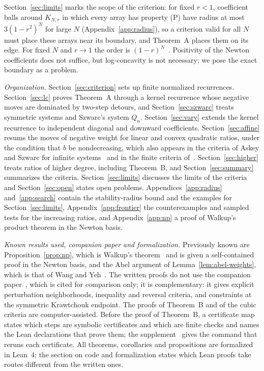 Section~\ref{sec:limits} marks the scope of the criterion: for fixed $r<1$, coefficient balls around $K_{N,r}$ in which every array has property (P) have radius at most $3(1-r^2)^N$ for large $N$ (Appendix~\ref{app:radius}), so a criterion valid for all $N$ must place these arrays near its boundary, and Theorem~A places them on its edge. For fixed $N$ and $r\to1$ the order is $(1-r)^N$~\cite[Corollary~]{P3}. Positivity of the Newton coefficients does not suffice, but log-concavity is not necessary; we pose the exact boundary as a problem.

\emph{Organization.} Section~\ref{sec:criterion} sets up finite normalized recurrences. Section~\ref{sec:lc} proves Theorem~A through a kernel recurrence whose negative moves are dominated by two-step detours, and Section~\ref{sec:szwarc} treats symmetric systems and Szwarc's system $Q_n$. Section~\ref{sec:vary} extends the kernel recurrence to independent diagonal and downward coefficients. Section~\ref{sec:affine} resums the moves of negative weight for linear and convex quadratic ratios, under the condition that $b$ be nondecreasing, which also appears in the criteria of Askey and Szwarc for infinite systems~\cite[Theorems~3.1 and~3.2]{szwarc} and in the finite criteria of~\cite{P3}. Section~\ref{sec:higher} treats ratios of higher degree, including Theorem~B, and Section~\ref{sec:summary} summarizes the criteria. Section~\ref{sec:limits} discusses the limits of the criteria and Section~\ref{sec:open} states open problems. Appendices~\ref{app:radius} and~\ref{app:search} contain the stability-radius bound and the examples for Section~\ref{sec:limits}, Appendix~\ref{app:frontier} the counterexamples and sampled tests for the increasing ratios, and Appendix~\ref{app:np} a proof of Walkup's product theorem in the Newton basis.

\emph{Known results used, companion paper and formalization.} Previously known are Proposition~\ref{prop:np}, which is Walkup's theorem~\cite{walkup} and is given a self-contained proof in the Newton basis, and the Abel argument of Lemma~\ref{lem:abel-weights}, which is that of Wang and Yeh~\cite{wangyeh}. The written proofs do not use the companion paper~\cite{P3}, which is cited for comparison only; it is complementary: it gives explicit perturbation neighborhoods, inequality and reversal criteria, and constraints at the symmetric Krawtchouk endpoint. The proofs of Theorem~B and of the cubic criteria are computer-assisted. Before the proof of Theorem~B, a certificate map states which steps are symbolic certificates and which are finite checks and names the Lean declarations that prove them; the supplement~\cite{suppB} gives the command that reruns each certificate. All theorems, corollaries and propositions are formalized in Lean~4; the section on code and formalization states which Lean proofs take routes different from the written ones.

